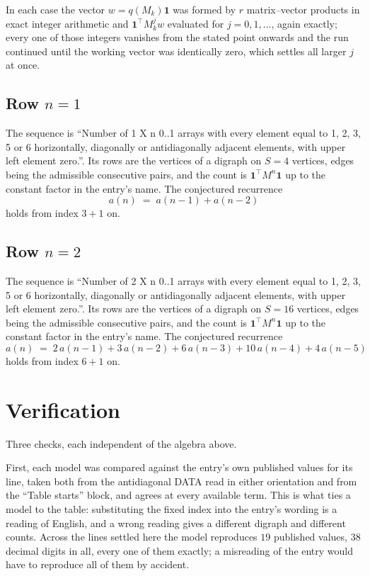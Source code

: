 \documentclass[11pt,a4paper]{article}
\theoremstyle{plain}
\theoremstyle{definition}
\begin{document}
In each case the vector $w=q(M_k)\mathbf{1}$ was formed by $r$ matrix--vector products in
exact integer arithmetic and $\mathbf{1}^{\!\top}M_k^{j}w$ evaluated for $j=0,1,\dots$,
again exactly; every one of those integers vanishes from the stated point onwards and the run
continued until the working vector was identically zero, which settles all larger $j$ at once.

\subsection*{Row $n$$=1$}
The sequence is ``Number of 1 X n 0..1 arrays with every element equal to 1, 2, 3, 5 or 6 horizontally, diagonally or antidiagonally adjacent elements, with upper left element zero.''. Its rows are the vertices of a digraph on
$S=4$ vertices, edges being the admissible consecutive pairs, and the count is
$\mathbf{1}^{\!\top}M^{n}\mathbf{1}$ up to the constant factor in the entry's name.
The conjectured recurrence
\[
a(n)\;=\;a(n-1) + a(n-2)
\]
holds from index $3+1$ on.

\subsection*{Row $n$$=2$}
The sequence is ``Number of 2 X n 0..1 arrays with every element equal to 1, 2, 3, 5 or 6 horizontally, diagonally or antidiagonally adjacent elements, with upper left element zero.''. Its rows are the vertices of a digraph on
$S=16$ vertices, edges being the admissible consecutive pairs, and the count is
$\mathbf{1}^{\!\top}M^{n}\mathbf{1}$ up to the constant factor in the entry's name.
The conjectured recurrence
\[
a(n)\;=\;2\,a(n-1) + 3\,a(n-2) + 6\,a(n-3) + 10\,a(n-4) + 4\,a(n-5)
\]
holds from index $6+1$ on.

\section{Verification}

Three checks, each independent of the algebra above.

First, each model was compared against the entry's own published values for its line, taken
both from the antidiagonal DATA read in either orientation and from the ``Table starts''
block, and agrees at every available term. This is what ties a model to the table:
substituting the fixed index into the entry's wording is a reading of English, and a wrong
reading gives a different digraph and different counts. Across the lines settled here the
model reproduces $19$ published values, $38$ decimal digits in all, every one of
them exactly; a misreading of the entry would have to reproduce all of them by accident.
\end{document}

